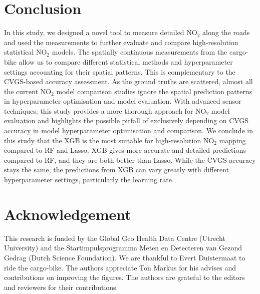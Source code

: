 \documentclass{article}
\begin{document}
\section{Conclusion}
In this study, we designed a novel tool to measure detailed NO$_2$ along the roads and used the measurements to further evaluate and compare high-resolution statistical NO$_2$ models.  The spatially continuous measurements from the cargo-bike allow us to compare different statistical methods and hyperparameter settings accounting for their spatial patterns. This is complementary to the CVGS-based accuracy assessment. As the ground truths are scattered, almost all the current NO$_2$ model comparison studies ignore the spatial prediction patterns in hyperparameter optimisation and model evaluation. With advanced sensor techniques, this study provides a more thorough approach for NO$_2$ model evaluation and highlights the possible pitfall of exclusively depending on CVGS accuracy in model hyperparameter optimisation and comparison. We conclude in this study that the XGB is the most suitable for high-resolution NO$_2$ mapping compared to RF and Lasso. XGB gives more accurate and detailed predictions compared to RF, and they are both better than Lasso. While the CVGS accuracy stays the same, the predictions from XGB can vary greatly with different hyperparameter settings, particularly the learning rate.    


\section*{Acknowledgement}
This research is funded by the Global Geo Health Data Centre (Utrecht University) and the Startimpulsprogramma Meten en Detecteren van Gezond Gedrag (Dutch Science Foundation). We are thankful to Evert Duistermaat to ride the cargo-bike. The authors appreciate Ton Markus for his advises and contributions on improving the figures. The authors are grateful to the editors and reviewers for their contributions. 

\newpage


\end{document}
